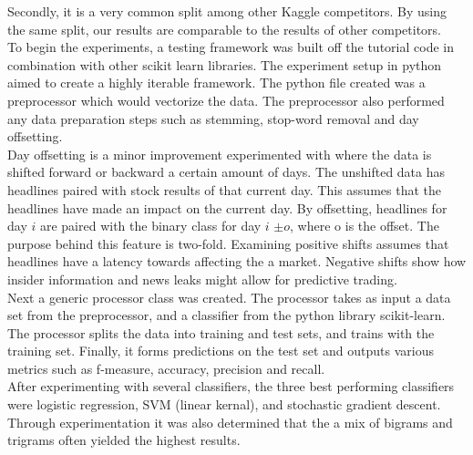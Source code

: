 \documentclass[11pt,a4paper]{article}
\begin{document}
Secondly, it is a very common split among other Kaggle competitors. By using the same split, our results are comparable to the results of other competitors.\\

To begin the experiments, a testing framework was built off the tutorial code in combination with other scikit learn libraries. The experiment setup in python aimed to create a highly iterable framework. The python file created was a preprocessor which would vectorize the data. The preprocessor also performed any data preparation steps such as stemming, stop-word removal and day offsetting.\\

Day offsetting is a minor improvement experimented with where the data is shifted forward or backward a certain amount of days. The unshifted data has headlines paired with stock results of that current day. This assumes that the headlines have made an impact on the current day. By offsetting, headlines for day $i$ are paired with the binary class for day $i$ $\pm o$, where o is the offset. The purpose behind this feature is two-fold. Examining positive shifts assumes that headlines have a latency towards affecting the a market. Negative shifts show how insider information and news leaks might allow for predictive trading.\\

Next a generic processor class was created. The processor takes as input a data set from the preprocessor, and a classifier from the python library scikit-learn. The processor splits the data into training and test sets, and trains with the training set. Finally, it forms predictions on the test set and outputs various metrics such as f-measure, accuracy, precision and recall.\\

After experimenting with several classifiers, the three best performing classifiers were logistic regression, SVM (linear kernal), and stochastic gradient descent. Through experimentation it was also determined that the a mix of bigrams and trigrams often yielded the highest results.
\end{document}
